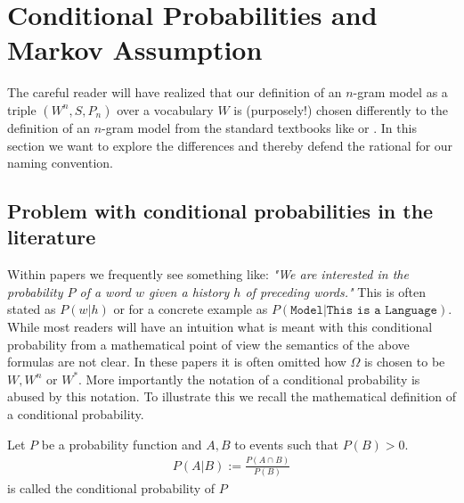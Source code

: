 \documentclass[•]{book}
\begin{document}
\section{Conditional Probabilities and Markov Assumption}
The careful reader will have realized that our definition of an $n$-gram model as a triple $(W^n,S,P_n)$ over a vocabulary $W$ is (purposely!) chosen differently to the definition of an $n$-gram model from the standard textbooks like \cite{book:Manning} or \cite{book:Jurafsky}. 
In this section we want to explore the differences and thereby defend the rational for our naming convention. 

\subsection{Problem with conditional probabilities in the literature}
Within papers we frequently see something like: \textit{"We are interested in the probability $P$ of a word $w$ given a history $h$ of preceding words."}
This is often stated as $P(w|h)$ or for a concrete example as $P(\texttt{Model}|\texttt{This is a Language})$. 
While most readers will have an intuition what is meant with this conditional probability from a mathematical point of view the semantics of the above formulas are not clear. 
In these papers it is often omitted how $\Omega$ is chosen to be $W, W^n$ or $W^{*}$. 
More importantly the notation of a conditional probability is abused by this notation.
To illustrate this we recall the mathematical definition of a conditional probability.
\begin{definition}
Let $P$ be a probability function and $A,B$ to events such that $P(B)>0$.
\begin{align}
P(A|B):=\frac{P(A\cap B)}{P(B)}
\end{align}
is called the conditional probability of $P$
\end{definition}
\end{document}

